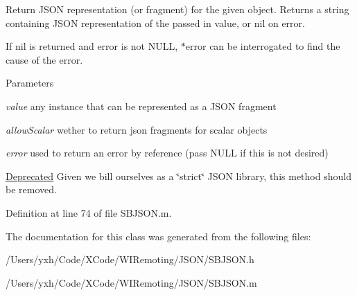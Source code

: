 Return JSON representation (or fragment) for the given object. Returns a string containing JSON representation of the passed in value, or nil on error.

If nil is returned and {\ttfamily error} is not NULL, {\ttfamily $\ast$error} can be interrogated to find the cause of the error.


\begin{DoxyParams}{Parameters}
\item[{\em value}]any instance that can be represented as a JSON fragment \item[{\em allowScalar}]wether to return json fragments for scalar objects \item[{\em error}]used to return an error by reference (pass NULL if this is not desired)\end{DoxyParams}
\begin{Desc}
\item[\hyperlink{deprecated__deprecated000003}{Deprecated}]Given we bill ourselves as a \char`\"{}strict\char`\"{} JSON library, this method should be removed. \end{Desc}


Definition at line 74 of file SBJSON.m.

The documentation for this class was generated from the following files:\begin{DoxyCompactItemize}
\item 
/Users/yxh/Code/XCode/WIRemoting/JSON/SBJSON.h\item 
/Users/yxh/Code/XCode/WIRemoting/JSON/SBJSON.m\end{DoxyCompactItemize}
